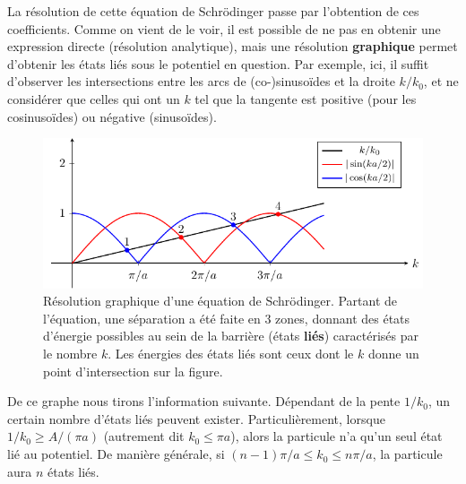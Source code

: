 \documentclass[12pt, a4paper]{book}
\begin{document}
La résolution de cette équation de Schrödinger passe par l'obtention de ces coefficients. Comme on vient de le voir, il est possible de ne pas en obtenir une expression directe (résolution analytique), mais une résolution \textbf{graphique} permet d'obtenir les états liés sous le potentiel en question. Par exemple, ici, il suffit d'observer les intersections entre les arcs de (co-)sinusoïdes et la droite $k/k_0$, et ne considérer que celles qui ont un $k$ tel que la tangente est positive (pour les cosinusoïdes) ou négative (sinusoïdes). 

\begin{figure}[h]
  \centering
  \includegraphics{images/chap2-puits_fini_solutions.pdf}
  \caption{Résolution graphique d'une équation de Schrödinger. Partant de l'équation, une séparation a été faite en 3 zones, donnant des états d'énergie possibles au sein de la barrière (états \textbf{liés}) caractérisés par le nombre $k$. Les énergies des états liés sont ceux dont le $k$ donne un point d'intersection sur la figure.}
\end{figure}

De ce graphe nous tirons l'information suivante.
Dépendant de la pente $1/k_0$, un certain nombre d'états liés peuvent exister. Particulièrement, lorsque $1/k_0  \geq A/(\pi a)$ (autrement dit $k_0 \leq \pi a$), alors la particule n'a qu'un seul état lié au potentiel. De manière générale, si $(n-1)\pi/a \leq k_0 \leq n\pi/a$, la particule aura $n$ états liés.
\end{document}
